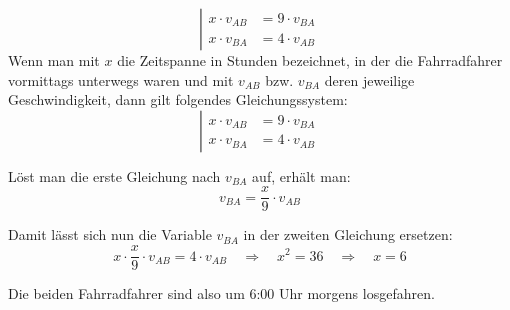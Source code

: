 \begin{exercise}
\begin{equation*}
      \left|
      \begin{split}
        x\cdot v_{AB}&=9\cdot v_{BA}\\
        x\cdot v_{BA}&=4\cdot v_{AB}
      \end{split}
      \right.
    \end{equation*}
  \fi
  \ifoutcome\outcome
    Wenn man mit $x$ die Zeitspanne in Stunden bezeichnet, in der die
    Fahrradfahrer vormittags unterwegs waren und mit $v_{AB}$ bzw.
    $v_{BA}$ deren jeweilige Geschwindigkeit, dann gilt folgendes
    Gleichungssystem:
    \begin{equation*}
      \left|
      \begin{split}
        x\cdot v_{AB}&=9\cdot v_{BA}\\
        x\cdot v_{BA}&=4\cdot v_{AB}
      \end{split}
      \right.
    \end{equation*}\par
    Löst man die erste Gleichung nach $v_{BA}$ auf, erhält man:
    \begin{equation*}
      v_{BA}=\frac{x}{9}\cdot v_{AB}
    \end{equation*}\par
    Damit lässt sich nun die Variable $v_{BA}$ in der zweiten
    Gleichung ersetzen:
    \begin{equation*}
      x\cdot\frac{x}{9}\cdot v_{AB}=4\cdot v_{AB}
      \quad\Rightarrow\quad
      x^2=36
      \quad\Rightarrow\quad
      x=6
    \end{equation*}\par
    Die beiden Fahrradfahrer sind also um 6:00 Uhr morgens losgefahren.
  \fi
\end{exercise}
